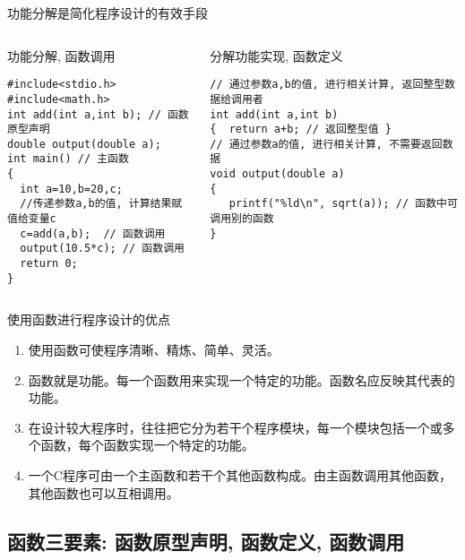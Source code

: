 \begin{frame}{功能分解是简化程序设计的有效手段}
\begin{columns}[T]
\begin{beamerboxesrounded}{功能分解, 函数调用}
\begin{lstlisting}
#include<stdio.h>
#include<math.h>
int add(int a,int b); // 函数原型声明
double output(double a);
int main() // 主函数
{
  int a=10,b=20,c;
  //传递参数a,b的值, 计算结果赋值给变量c 
  c=add(a,b);  // 函数调用
  output(10.5*c); // 函数调用
  return 0; 
}
\end{lstlisting}
\end{beamerboxesrounded}
\begin{beamerboxesrounded}{分解功能实现, 函数定义}
\begin{lstlisting}
// 通过参数a,b的值, 进行相关计算, 返回整型数据给调用者
int add(int a,int b)
{  return a+b; // 返回整型值 }
// 通过参数a的值, 进行相关计算, 不需要返回数据
void output(double a)
{  
   printf("%ld\n", sqrt(a)); // 函数中可调用别的函数
}
\end{lstlisting}
\end{beamerboxesrounded}
\end{columns}
\end{frame}

\begin{frame}{使用函数进行程序设计的优点}
\begin{enumerate}
	\setlength{\itemsep}{.5cm}
	\item 使用函数可使程序清晰、精炼、简单、灵活。
	\item 函数就是功能。每一个函数用来实现一个特定的功能。函数名应反映其代表的功能。
	\item 在设计较大程序时，往往把它分为若干个程序模块，每一个模块包括一个或多个函数，每个函数实现一个特定的功能。
	\item 一个C程序可由一个主函数和若干个其他函数构成。由主函数调用其他函数，其他函数也可以互相调用。	
\end{enumerate}
\end{frame}

\subsection{函数三要素: 函数原型声明, 函数定义, 函数调用}

